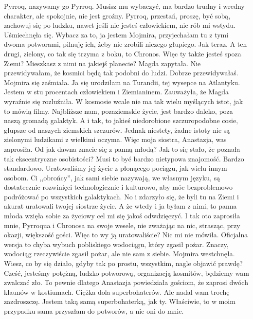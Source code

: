 \begin{dialogue}
\ds{} Pyrroq, nazywamy go Pyrroq. Musisz mu wybaczyć, ma bardzo trudny i wredny charakter, ale spokojnie, nie jest groźny. 
Pyrroq, przestań, proszę, być sobą, zachowuj się po ludzku, nawet jeśli nie jesteś człowiekiem, nie rób mi wstydu.
\dm{} Uśmiechnęła się. \dm{}
Wybacz za to, ja jestem Mojmira, przyjechałam tu z tymi dwoma potworami, pilnuję ich, żeby nie zrobili niczego głupiego. Jak teraz. 
A ten drugi, zielony, co tak się trzyma z boku, to Chronos.
\ds{} Więc ty także jesteś spoza Ziemi? Mieszkasz z nimi na jakiejś planecie? \dm{} Magda zapytała. \dm{} Nie przewidywałam, że kosmici będą tak podobni do ludzi.
\ds{} Dobrze przewidywałaś. \dm{} Mojmira się zaśmiała. \dm{} Ja się urodziłam na Turandii, tej wysepce na Atlantyku. Jestem w stu procentach człowiekiem i Ziemianinem.
\dm{} Zauważyła, że Magda wyraźnie się rozluźniła. \dm{} W kosmosie wcale nie ma tak wielu myślących istot, jak to mówią filmy. 
Najbliższe nam, pozaziemskie życie, jest bardzo daleko, poza naszą gromadą galaktyk. 
A i tak, to jakieś niedorobione szczuropodobne cosie, głupsze od naszych ziemskich szczurów.
Jednak niestety, żadne istoty nie są zielonymi ludzikami z wielkimi oczyma.
\ds{} Więc moja siostra, Anastazja, was zaprosiła. Od jak dawna znacie się z panną młodą? 
Jak to się stało, że poznała tak ekscentryczne osobistości? Musi to być bardzo nietypowa znajomość.
\ds{} Bardzo standardowo. Uratowaliśmy jej życie z płonącego pociągu, jak wielu innym osobom. 
Ci ,,obrońcy'', jak sami siebie nazywają, we własnym języku, są dostatecznie rozwinięci technologicznie i kulturowo, 
aby móc bezproblemowo podróżować po wszystkich galaktykach.
No i zdarzyło się, że byli tu na Ziemi i akurat uratowali twojej siostrze życie.
A że wtedy i ja byłam z nimi, to panna młoda wzięła sobie za życiowy cel mi się jakoś odwdzięczyć. 
I tak oto zaprosiła mnie, Pyrroqua i Chronosa na swoje wesele, nie zważając na nic, strasząc, przy okazji, większość gości.
\ds{} Więc to wy ją uratowaliście? Nic mi nie mówiła.
\ds{} Oficjalna wersja to chyba wybuch pobliskiego wodociągu, który zgasił pożar. 
Znaczy, wodociąg rzeczywiście zgasił pożar, ale nie sam z siebie.
\dm{} Mojmira westchnęła. \dm{}
Wiesz, co by się działo, gdyby tak po prostu, wszystkim, nagle objawić prawdę?
Cześć, jesteśmy potężną, ludzko-potworową, organizacją kosmitów, będziemy wam zwalczać zło.
\ds{} To pewnie dlatego Anastazja powiedziała gościom, że zaprosi dwóch klaunów w kostiumach. Ciężka dola superbohaterów. Ale nadal wam trochę zazdroszczę.
\ds{} Jestem taką samą superbohaterką, jak ty. Właściwie, to w moim przypadku sama przyszłam do potworów, a nie oni do mnie.

\end{dialogue}
